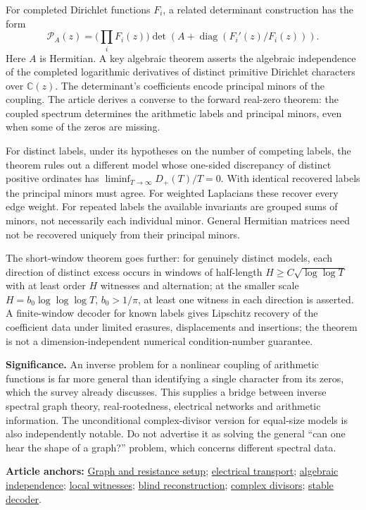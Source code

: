 \documentclass[11pt]{article}
\newcommand{\art}[3]{\href{https://github.com/VladimirReshetnikov/ProveIt/blob/3c4d27a69c98d09319a51e41a19fca05bb80a3e2/Analysis/GeneralizedRiemannHypothesis/Article/sections/#1.tex\#L#2}{#3}}
\newcommand{\sources}[1]{\par\smallskip\noindent\textbf{Article anchors:} #1\par}
\begin{document}
For completed Dirichlet functions $F_i$, a related determinant construction has the form
\[
 \mathcal P_A(z)=\Big(\prod_i F_i(z)\Big)
 \det\left(A+\operatorname{diag}(F_i'(z)/F_i(z))\right).
\]
Here $A$ is Hermitian. A key algebraic theorem asserts the algebraic independence of the completed logarithmic derivatives of distinct primitive Dirichlet characters over $\mathbb C(z)$. The determinant's coefficients encode principal minors of the coupling. The article derives a converse to the forward real-zero theorem: the coupled spectrum determines the arithmetic labels and principal minors, even when some of the zeros are missing.

For distinct labels, under its hypotheses on the number of competing labels, the theorem rules out a different model whose one-sided discrepancy of distinct positive ordinates has $\liminf_{T\to\infty}D_+(T)/T=0$. With identical recovered labels the principal minors must agree. For weighted Laplacians these recover every edge weight. For repeated labels the available invariants are grouped sums of minors, not necessarily each individual minor. General Hermitian matrices need not be recovered uniquely from their principal minors.

The short-window theorem goes further: for genuinely distinct models, each direction of distinct excess occurs in windows of half-length $H\ge C\sqrt{\log\log T}$ with at least order $H$ witnesses and alternation; at the smaller scale $H=b_0\log\log\log T$, $b_0>1/\pi$, at least one witness in each direction is asserted. A finite-window decoder for known labels gives Lipschitz recovery of the coefficient data under limited erasures, displacements and insertions; the theorem is not a dimension-independent numerical condition-number guarantee.

\textbf{Significance.} An inverse problem for a nonlinear coupling of arithmetic functions is far more general than identifying a single character from its zeros, which the survey already discusses. This supplies a bridge between inverse spectral graph theory, real-rootedness, electrical networks and arithmetic information. The unconditional complex-divisor version for equal-size models is also independently notable. Do not advertise it as solving the general ``can one hear the shape of a graph?'' problem, which concerns different spectral data.
\sources{\art{zer}{5030}{Graph and resistance setup}; \art{zer}{5057}{electrical transport}; \art{zer}{5544}{algebraic independence}; \art{zer}{5942}{local witnesses}; \art{zer}{6023}{blind reconstruction}; \art{zer}{6052}{complex divisors}; \art{zer}{6207}{stable decoder}.}
\clearpage
\end{document}
